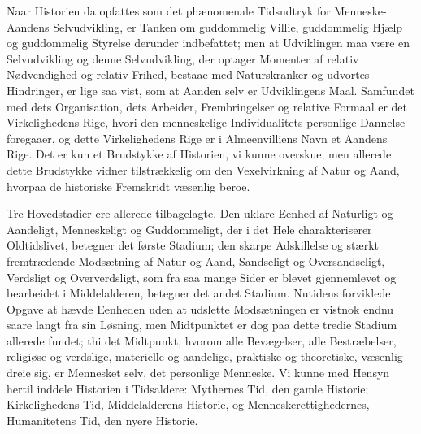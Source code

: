 \documentclass[12pt]{book}
\newcommand{\apage}[1]{\marginnote{\footnotesize\textit{[#1]}}}
\begin{document}
Naar Historien da opfattes som det phænomenale Tidsudtryk for
Menneske-Aandens Selvudvikling, er Tanken om guddommelig Villie, guddommelig
Hjælp og guddommelig Styrelse derunder indbefattet; men at Udviklingen maa
være en Selvudvikling og denne Selvudvikling, der optager Momenter af relativ
Nødvendighed og relativ Frihed, bestaae med Naturskranker og udvortes
Hindringer, er lige saa vist, som at Aanden selv er Udviklingens Maal.
Samfundet med dets Organisation, dets Arbeider, Frembringelser og relative
Formaal er det Virkelighedens Rige, hvori den menneskelige Individualitets
personlige Dannelse foregaaer, og dette Virkelighedens Rige er i
Almeenvilliens Navn et Aandens Rige. Det er kun et Brudstykke af Historien,
vi kunne overskue; men allerede dette Brudstykke vidner tilstrækkelig om den
Vexelvirkning af Natur og Aand, hvorpaa de historiske Fremskridt væsenlig
beroe.

Tre Hovedstadier ere allerede tilbagelagte. Den uklare Eenhed af Naturligt
og Aandeligt, Menneskeligt og Guddommeligt, der i det Hele charakteriserer
Oldtidslivet, betegner det første Stadium; den skarpe Adskillelse og stærkt
fremtrædende Modsætning af Natur og Aand, Sandseligt og Oversandseligt,
Verdsligt og Oververdsligt, som fra saa mange Sider er blevet gjennemlevet
og bearbeidet i Middelalderen, betegner \apage{241} det andet Stadium. Nutidens
forviklede Opgave at hævde Eenheden uden at udslette Modsætningen er vistnok
endnu saare langt fra sin Løsning, men Midtpunktet er dog paa dette tredie
Stadium allerede fundet; thi det Midtpunkt, hvorom alle Bevægelser, alle
Bestræbelser, religiøse og verdslige, materielle og aandelige, praktiske og
theoretiske, væsenlig dreie sig, er Mennesket selv, det personlige Menneske.
Vi kunne med Hensyn hertil inddele Historien i Tidsaldere: Mythernes Tid,
den gamle Historie; Kirkelighedens Tid, Middelalderens Historie, og
Menneskerettighedernes, Humanitetens Tid, den nyere Historie.
\end{document}
